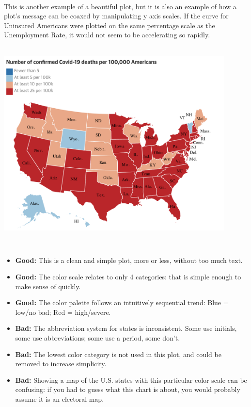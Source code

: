 \documentclass[
]{book}
\providecommand{\tightlist}{%
  \setlength{\itemsep}{0pt}\setlength{\parskip}{0pt}}
\begin{document}
~

This is another example of a beautiful plot, but it is also an example of how a plot's message can be coaxed by manipulating y axis scales. If the curve for Uninsured Americans were plotted on the same percentage scale as the Unemployment Rate, it would not seem to be accelerating so rapidly.

~\\

\includegraphics[width=0.9\textwidth,height=\textheight]{img/visb.png}

~

\begin{itemize}
\tightlist
\item
  \textbf{Good:} This is a clean and simple plot, more or less, without too much text.
\item
  \textbf{Good:} The color scale relates to only 4 categories: that is simple enough to make sense of quickly.\\
\item
  \textbf{Good:} The color palette follows an intuitively sequential trend: Blue = low/no bad; Red = high/severe.
\item
  \textbf{Bad:} The abbreviation system for states is inconsistent. Some use initials, some use abbreviations; some use a period, some don't.\\
\item
  \textbf{Bad:} The lowest color category is not used in this plot, and could be removed to increase simplicity.\\
\item
  \textbf{Bad:} Showing a map of the U.S. states with this particular color scale can be confusing: if you had to guess what this chart is about, you would probably assume it is an electoral map.
\end{itemize}
\end{document}
